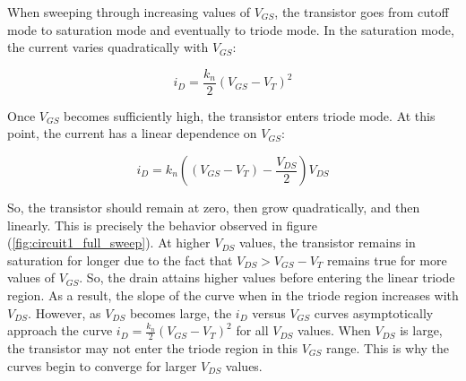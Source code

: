 \FloatBarrier

When sweeping through increasing values of $V_{GS}$, the transistor goes from cutoff mode to saturation mode and eventually to triode mode. In the saturation mode, the current varies quadratically with $V_{GS}$:

\begin{equation}
	\label{eq:sat_current}
	i_D = \frac{k_n}{2} ( V_{GS} - V_{T} )^2
\end{equation}

Once $V_{GS}$ becomes sufficiently high, the transistor enters triode mode. At this point, the current has a linear dependence on $V_{GS}$:

\begin{equation}
	\label{eq:triode_current}
	i_D = k_n ( ( V_{GS} - V_{T} ) - \frac{V_{DS}}{2} ) V_{DS}
\end{equation}

So, the transistor should remain at zero, then grow quadratically, and then linearly. This is precisely the behavior observed in figure (\ref{fig:circuit1_full_sweep}). At higher $V_{DS}$ values, the transistor remains in saturation for longer due to the fact that $V_{DS} > V_{GS} - V_{T}$ remains true for more values of $V_{GS}$. So, the drain attains higher values before entering the linear triode region. As a result, the slope of the curve when in the triode region increases with $V_{DS}$. However, as $V_{DS}$ becomes large, the $i_D$ versus $V_{GS}$ curves asymptotically approach the curve $i_D = \frac{k_n}{2} ( V_{GS} - V_{T} )^2$ for all $V_{DS}$ values. When $V_{DS}$ is large, the transistor may not enter the triode region in this $V_{GS}$ range. This is why the curves begin to converge for larger $V_{DS}$ values. 
